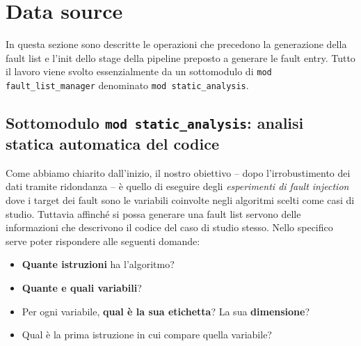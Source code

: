 \newpage
\section{Data source}
In questa sezione sono descritte le operazioni che precedono la generazione della fault list e l'init dello stage della pipeline preposto a generare le fault entry. Tutto il lavoro viene svolto essenzialmente da un sottomodulo di \texttt{mod fault\_list\_manager} denominato \texttt{mod static\_analysis}.

\subsection{Sottomodulo \texttt{mod static\_analysis}: analisi statica automatica del codice}
Come abbiamo chiarito dall'inizio, il nostro obiettivo -- dopo l'irrobustimento dei dati tramite ridondanza -- è quello di eseguire degli \textit{esperimenti di fault injection} dove i target dei fault sono le variabili coinvolte negli algoritmi scelti come casi di studio. Tuttavia affinché si possa generare una fault list servono delle informazioni che descrivono il codice del caso di studio stesso. Nello specifico serve poter rispondere alle seguenti domande: 
\begin{itemize}
    \itemsep-0.2em
    \item[\ding{52}] \textbf{Quante istruzioni} ha l'algoritmo?
    \item[\ding{52}] \textbf{Quante e quali variabili}?
    \item[\ding{52}] Per ogni variabile, \textbf{qual è la sua etichetta}? La sua \textbf{dimensione}? 
    \item[\ding{52}] Qual è la prima istruzione in cui compare quella variabile? 
\end{itemize}

